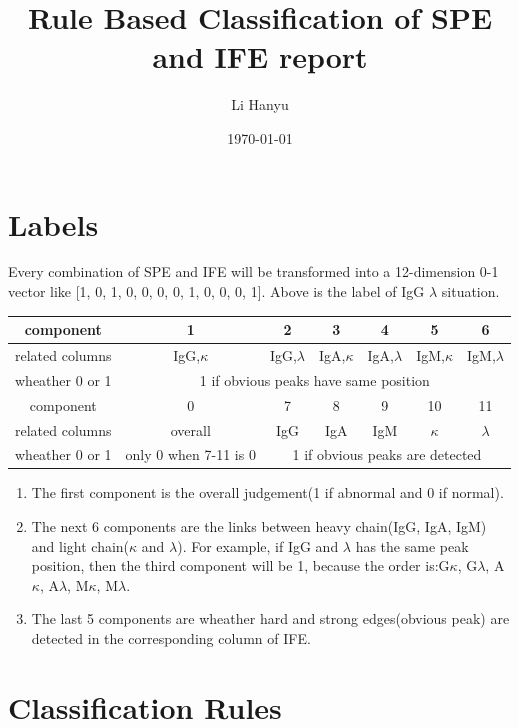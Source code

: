 \documentclass[12pt]{ctexart}
\title{Rule Based Classification of SPE and IFE report}
\author{Li Hanyu}
\date{\today}
\begin{document}
\maketitle
\newpage
\section{Labels}
\par Every combination of SPE and IFE will be transformed into a 12-dimension 0-1 vector like [1, 0, 1, 0, 0, 0, 0, 1, 0, 0, 0, 1]. Above is the label of IgG $\lambda$ situation.

\begin{tabular}{|c|c|c|c|c|c|c|}
    \hline
    component&1&2&3&4&5&6\\
    \hline
    related columns&IgG,$\kappa$&IgG,$\lambda$&IgA,$\kappa$&IgA,$\lambda$&IgM,$\kappa$&IgM,$\lambda$\\
    \hline
    wheather 0 or 1&\multicolumn{6}{|c|}{1 if obvious peaks have same position}\\
    \hline
    \hline
    component&0&7&8&9&10&11\\
    \hline
    related columns&overall&IgG&IgA&IgM&$\kappa$&$\lambda$\\
    \hline
    wheather 0 or 1&only 0 when 7-11 is 0&\multicolumn{5}{|c|}{1 if obvious peaks are detected}\\
    \hline
    \end{tabular}
\begin{enumerate}
    \item The first component is the overall judgement(1 if abnormal and 0 if normal).
    \item The next 6 components are the links between heavy chain(IgG, IgA, IgM) and light chain($\kappa$ and $\lambda$). For example, if IgG and $\lambda$ has the same peak position, then the third component will be 1, because the order is:G$\kappa$, G$\lambda$, A$\kappa$, A$\lambda$, M$\kappa$, M$\lambda$.
    \item The last 5 components are wheather hard and strong edges(obvious peak) are detected in the corresponding column of IFE.
\end{enumerate}
\section{Classification Rules}
\end{document}
